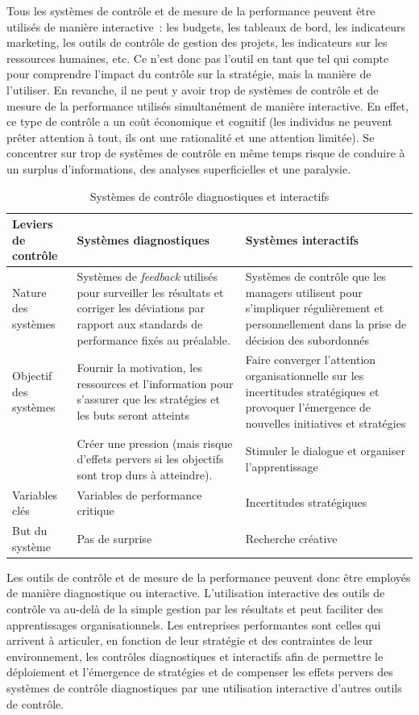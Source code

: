 \documentclass{tufte-handout}
\begin{document}
\begin{enumerate}
Tous les systèmes de contrôle et de mesure de la performance peuvent être utilisés de manière interactive : les budgets, les tableaux de bord, les indicateurs marketing, les outils de contrôle de gestion des projets, les indicateurs sur les ressources humaines, etc. Ce n'est donc pas l'outil en tant que tel qui compte pour comprendre l'impact du contrôle sur la stratégie, mais la manière de l'utiliser. En revanche, il ne peut y avoir trop de systèmes de contrôle et de mesure de la performance utilisés simultanément de manière interactive. En effet, ce type de contrôle a un coût économique et cognitif (les individus ne peuvent prêter attention à tout, ils ont une rationalité et une attention limitée). Se concentrer sur trop de systèmes de contrôle en même temps risque de conduire à un surplus d'informations, des analyses superficielles et une paralysie.\\

\begin{table}[htbp]
\caption{Systèmes de contrôle diagnostiques et interactifs}
\centering
\begin{tabular}{lll}
Leviers de contrôle & Systèmes diagnostiques & Systèmes interactifs\\
\hline
Nature des systèmes & Systèmes de \emph{feedback} utilisés pour surveiller les résultats et corriger les déviations par rapport aux standards de performance fixés au préalable. & Systèmes de contrôle que les managers utilisent pour s'impliquer régulièrement et personnellement dans la prise de décision des subordonnés\\
Objectif des systèmes & Fournir la motivation, les ressources et l'information pour s'assurer que les stratégies et les buts seront atteints & Faire converger l'attention organisationnelle sur les incertitudes stratégiques et provoquer l'émergence de nouvelles initiatives et stratégies\\
 & Créer une pression (mais risque d'effets pervers si les objectifs sont trop durs à atteindre). & Stimuler le dialogue et organiser l'apprentissage\\
Variables clés & Variables de performance critique & Incertitudes stratégiques\\
But du système & Pas de surprise & Recherche créative\\
\end{tabular}
\end{table}

Les outils de contrôle et de mesure de la performance peuvent donc être employés de manière diagnostique ou interactive. L'utilisation interactive des outils de contrôle va au-delà de la simple gestion par les résultats et peut faciliter des apprentissages organisationnels. Les entreprises performantes sont celles qui arrivent à articuler, en fonction de leur stratégie et des contraintes de leur environnement, les contrôles diagnostiques et interactifs afin de permettre le déploiement et l'émergence de stratégies et de compenser les effets pervers des systèmes de contrôle diagnostiques par une utilisation interactive d'autres outils de contrôle.\\


\end{enumerate}
\end{document}
